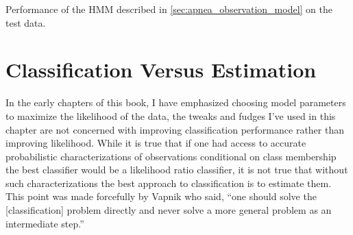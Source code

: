 \begin{table*}
  \centering
  
  \caption[Performance]{Performance of the HMM described in
    \ref{sec:apnea_observation_model} on the test data.}
  \label{tab:test_score}
\end{table*}

\section{Classification Versus Estimation}
\label{sec:ClassVsEst}

In the early chapters of this book, I have emphasized choosing model
parameters to maximize the likelihood of the data, the tweaks and
fudges I've used in this chapter are not concerned with improving
classification performance rather than improving likelihood.  While it
is true that if one had access to accurate probabilistic
characterizations of observations conditional on class membership the
best classifier would be a likelihood ratio classifier, it is not true
that without such characterizations the best approach to
classification is to estimate them.  This point was made forcefully by
Vapnik\cite{Vapnik98} who said, ``one should solve the [classification]
problem directly and never solve a more general problem as an
intermediate step.''

